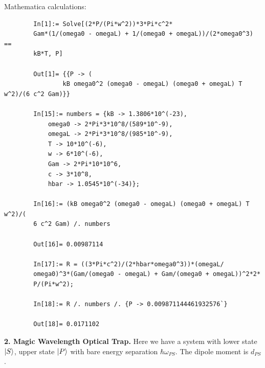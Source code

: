 \documentclass{article}
\theoremstyle{definition}
\begin{document}
\begin{enumerate}[label=(\alph*)]
\begin{enumerate}[label=(\roman*)]
	Mathematica calculations:
	\begin{lstlisting}
		In[1]:= Solve[(2*P/(Pi*w^2))*3*Pi*c^2*
		Gam*(1/(omega0 - omegaL) + 1/(omega0 + omegaL))/(2*omega0^3) == 
		kB*T, P]
		
		Out[1]= {{P -> (
				kB omega0^2 (omega0 - omegaL) (omega0 + omegaL) T w^2)/(6 c^2 Gam)}}
		
		In[15]:= numbers = {kB -> 1.3806*10^(-23),
			omega0 -> 2*Pi*3*10^8/(589*10^-9),
			omegaL -> 2*Pi*3*10^8/(985*10^-9),
			T -> 10*10^(-6),
			w -> 6*10^(-6),
			Gam -> 2*Pi*10*10^6,
			c -> 3*10^8,
			hbar -> 1.0545*10^(-34)};
		
		In[16]:= (kB omega0^2 (omega0 - omegaL) (omega0 + omegaL) T w^2)/(
		6 c^2 Gam) /. numbers
		
		Out[16]= 0.00987114
		
		In[17]:= R = ((3*Pi*c^2)/(2*hbar*omega0^3))*(omegaL/
		omega0)^3*(Gam/(omega0 - omegaL) + Gam/(omega0 + omegaL))^2*2*
		P/(Pi*w^2);
		
		In[18]:= R /. numbers /. {P -> 0.009871144461932576`}
		
		Out[18]= 0.0171102
	\end{lstlisting}
	\end{enumerate}
\end{enumerate}


\noindent \textbf{2. Magic Wavelength Optical Trap.} Here we have a system with lower state $\ket{S}$, upper state $\ket{P}$ with bare energy separation $\hbar \omega_{PS}$. The dipole moment is $d_{PS}$. 
\end{document}
